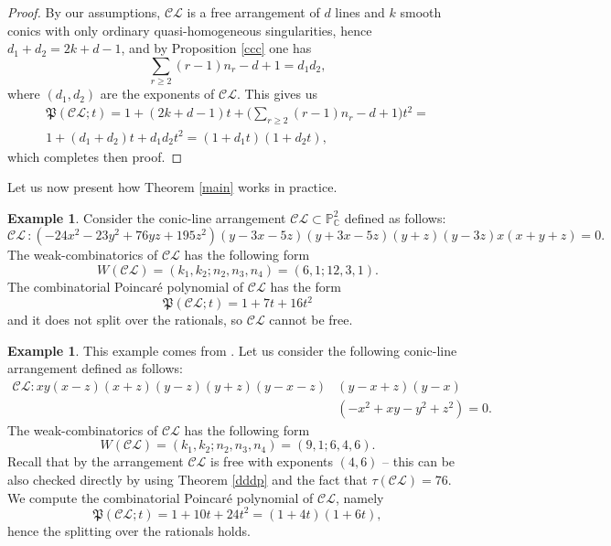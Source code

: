 \documentclass[12pt]{article}
\theoremstyle{plain}
\theoremstyle{definition}
\newtheorem{example}[thm]{Example}
\begin{document}
\begin{proof}
By our assumptions, $\mathcal{CL}$ is a free arrangement of $d$ lines and $k$ smooth conics with only ordinary quasi-homogeneous singularities, hence $d_{1} + d_{2} = 2k+d-1$, and by Proposition \ref{ccc} one has 
$$\sum_{r\geq 2}(r-1)n_{r} -d+1 =d_{1}d_{2},$$
where $(d_{1},d_{2})$ are the exponents of $\mathcal{CL}$. This gives us 
\begin{multline*}
\mathfrak{P}(\mathcal{CL};t) = 1 + (2k+d-1)t + \bigg( \sum_{r\geq 2}(r-1)n_{r} -d+1 \bigg)t^{2} = \\ 1 + (d_{1}+d_{2})t + d_{1}d_{2}t^{2} = (1+d_{1}t)(1+d_{2}t),    
\end{multline*}
which completes then proof.
\end{proof}

Let us now present how Theorem \ref{main} works in practice.
\begin{example}
Consider the conic-line arrangement $\mathcal{CL} \subset \mathbb{P}^{2}_{\mathbb{C}}$ defined as follows:
\begin{equation*}
\mathcal{CL} \, : (-24x^{2}-23y^{2}+76yz+195z^{2})(y-3x-5z)(y+3x-5z)(y+z)(y-3z)x(x+y+z) = 0.
\end{equation*}
The weak-combinatorics of $\mathcal{CL}$ has the following form
$$W(\mathcal{CL}) = (k_{1}, k_{2}; n_{2}, n_{3}, n_{4}) = (6,1;12,3,1).$$
The combinatorial Poincar\'e polynomial of $\mathcal{CL}$ has the form
$$\mathfrak{P}(\mathcal{CL};t) = 1+7t+16t^2$$
and it does not split over the rationals, so $\mathcal{CL}$ cannot be free.
\end{example}
\begin{example}
This example comes from \cite{PP2024}. Let us consider the following conic-line arrangement defined as follows:
\begin{align*}
\mathcal{CL}  : xy(x-z)(x+z)(y-z)(y+z)(y-x-z)&(y-x+z)(y-x)\\&(-x^2+xy-y^2+z^2)=0.      
\end{align*}
The weak-combinatorics of $\mathcal{CL}$ has the following form
$$W(\mathcal{CL}) = (k_{1}, k_{2}; n_{2}, n_{3}, n_{4}) = (9, 1; 6, 4,6).$$
Recall that by \cite[Theorem 1.3]{PP2024} the arrangement $\mathcal{CL}$ is free with exponents $(4,6)$ -- this can be also checked directly by using Theorem \ref{dddp} and the fact that $\tau(\mathcal{CL})=76$. We compute the combinatorial Poincar\'e polynomial of $\mathcal{CL}$, namely
$$\mathfrak{P}(\mathcal{CL};t) = 1+10t+24t^2 = (1+4t)(1+6t),$$
hence the splitting over the rationals holds. 
\end{example}
\end{document}
